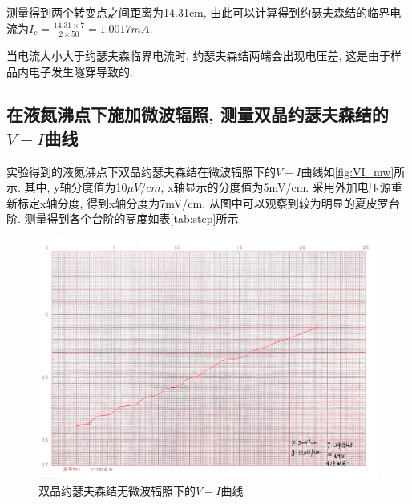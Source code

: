 \documentclass[font=default]{mpltx}
\begin{document}
  测量得到两个转变点之间距离为14.31cm, 由此可以计算得到约瑟夫森结的临界电流为$I_c=\frac{14.31\times 7}{2\times 50}=1.0017mA$.

  \par
  当电流大小大于约瑟夫森临界电流时, 约瑟夫森结两端会出现电压差, 这是由于样品内电子发生隧穿导致的.

  \subsection{在液氮沸点下施加微波辐照, 测量双晶约瑟夫森结的$V-I$曲线}
  实验得到的液氮沸点下双晶约瑟夫森结在微波辐照下的$V-I$曲线如\autoref{fig:VI_mw}所示. 其中, y轴分度值为10$\mu V/cm$, x轴显示的分度值为5mV/cm.
  采用外加电压源重新标定x轴分度, 得到x轴分度为7mV/cm.
  从图中可以观察到较为明显的夏皮罗台阶.
  测量得到各个台阶的高度如表\autoref{tab:step}所示.
  \begin{figure}[htbp]
      \centering
      \includegraphics[width=0.85\linewidth]{fig/5.jpg}
      \caption{双晶约瑟夫森结无微波辐照下的$V-I$曲线}
      \label{fig:VI_mw}
    \end{figure}
  
\end{document}
